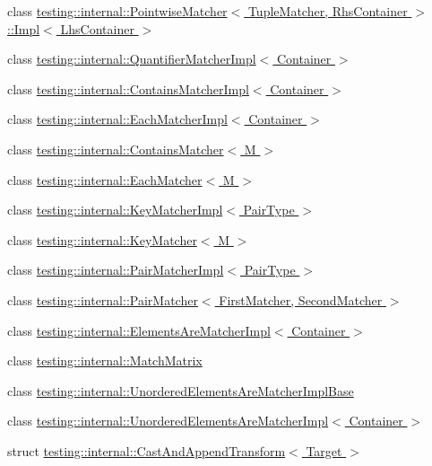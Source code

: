 \begin{DoxyCompactItemize}
\item 
class \hyperlink{classtesting_1_1internal_1_1PointwiseMatcher_1_1Impl}{testing\+::internal\+::\+Pointwise\+Matcher$<$ Tuple\+Matcher, Rhs\+Container $>$\+::\+Impl$<$ Lhs\+Container $>$}
\item 
class \hyperlink{classtesting_1_1internal_1_1QuantifierMatcherImpl}{testing\+::internal\+::\+Quantifier\+Matcher\+Impl$<$ Container $>$}
\item 
class \hyperlink{classtesting_1_1internal_1_1ContainsMatcherImpl}{testing\+::internal\+::\+Contains\+Matcher\+Impl$<$ Container $>$}
\item 
class \hyperlink{classtesting_1_1internal_1_1EachMatcherImpl}{testing\+::internal\+::\+Each\+Matcher\+Impl$<$ Container $>$}
\item 
class \hyperlink{classtesting_1_1internal_1_1ContainsMatcher}{testing\+::internal\+::\+Contains\+Matcher$<$ M $>$}
\item 
class \hyperlink{classtesting_1_1internal_1_1EachMatcher}{testing\+::internal\+::\+Each\+Matcher$<$ M $>$}
\item 
class \hyperlink{classtesting_1_1internal_1_1KeyMatcherImpl}{testing\+::internal\+::\+Key\+Matcher\+Impl$<$ Pair\+Type $>$}
\item 
class \hyperlink{classtesting_1_1internal_1_1KeyMatcher}{testing\+::internal\+::\+Key\+Matcher$<$ M $>$}
\item 
class \hyperlink{classtesting_1_1internal_1_1PairMatcherImpl}{testing\+::internal\+::\+Pair\+Matcher\+Impl$<$ Pair\+Type $>$}
\item 
class \hyperlink{classtesting_1_1internal_1_1PairMatcher}{testing\+::internal\+::\+Pair\+Matcher$<$ First\+Matcher, Second\+Matcher $>$}
\item 
class \hyperlink{classtesting_1_1internal_1_1ElementsAreMatcherImpl}{testing\+::internal\+::\+Elements\+Are\+Matcher\+Impl$<$ Container $>$}
\item 
class \hyperlink{classtesting_1_1internal_1_1MatchMatrix}{testing\+::internal\+::\+Match\+Matrix}
\item 
class \hyperlink{classtesting_1_1internal_1_1UnorderedElementsAreMatcherImplBase}{testing\+::internal\+::\+Unordered\+Elements\+Are\+Matcher\+Impl\+Base}
\item 
class \hyperlink{classtesting_1_1internal_1_1UnorderedElementsAreMatcherImpl}{testing\+::internal\+::\+Unordered\+Elements\+Are\+Matcher\+Impl$<$ Container $>$}
\item 
struct \hyperlink{structtesting_1_1internal_1_1CastAndAppendTransform}{testing\+::internal\+::\+Cast\+And\+Append\+Transform$<$ Target $>$}

\end{DoxyCompactItemize}
